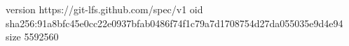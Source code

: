 version https://git-lfs.github.com/spec/v1
oid sha256:91a8bfc45e0cc22e0937bfab0486f74f1c79a7d1708754d27da055035e9d4e94
size 5592560
